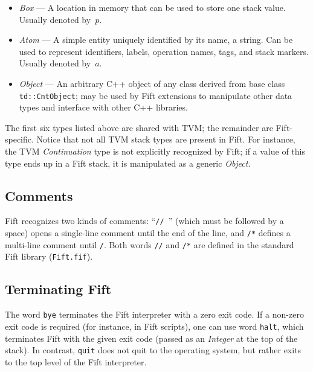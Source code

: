 \documentclass[12pt,oneside]{article}
\def\mysubsection#1{\subsection{#1}\fancyhead[C]{\small{\textsc{\textrm{\thesubsection.} #1}}}}
\begin{document}
\begin{itemize}
\item {\em Box\/} --- A location in memory that can be used to store one stack value. Usually denoted by~$p$.
\item {\em Atom\/} --- A simple entity uniquely identified by its name, a string. Can be used to represent identifiers, labels, operation names, tags, and stack markers. Usually denoted by~$a$.
\item {\em Object\/} --- An arbitrary C++ object of any class derived from base class {\tt td::CntObject}; may be used by Fift extensions to manipulate other data types and interface with other C++ libraries.
\end{itemize}

The first six types listed above are shared with TVM; the remainder are Fift-specific. Notice that not all TVM stack types are present in Fift. For instance, the TVM {\em Continuation\/} type is not explicitly recognized by Fift; if a value of this type ends up in a Fift stack, it is manipulated as a generic {\em Object}.

\mysubsection{Comments}\label{p:comments}
Fift recognizes two kinds of comments: ``{\tt // }'' (which must be followed by a space) opens a single-line comment until the end of the line, and {\tt /*} defines a multi-line comment until {\tt */}. Both words {\tt //} and {\tt /*} are defined in the standard Fift library ({\tt Fift.fif}).

\mysubsection{Terminating Fift}\label{p:exit.fift}
The word {\tt bye} terminates the Fift interpreter with a zero exit code. If a non-zero exit code is required (for instance, in Fift scripts), one can use word {\tt halt}, which terminates Fift with the given exit code (passed as an {\em Integer\/} at the top of the stack). In contrast, {\tt quit} does not quit to the operating system, but rather exits to the top level of the Fift interpreter.
\end{document}
